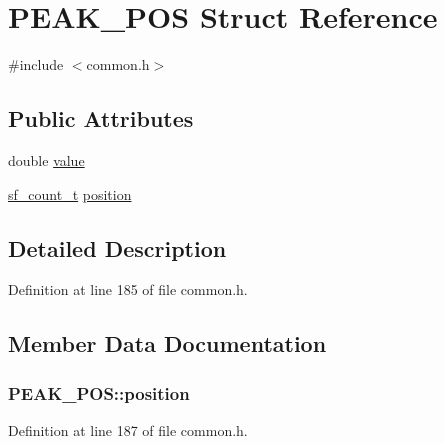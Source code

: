 \hypertarget{struct_p_e_a_k___p_o_s}{}\section{P\+E\+A\+K\+\_\+\+P\+OS Struct Reference}
\label{struct_p_e_a_k___p_o_s}


{\ttfamily \#include $<$common.\+h$>$}

\subsection*{Public Attributes}
\begin{DoxyCompactItemize}
\item 
double \hyperlink{struct_p_e_a_k___p_o_s_aa7d1d61bf8e210b4bf782c5aba0be3a1}{value}
\item 
\hyperlink{mac_2config_2i386_2lib-src_2libsndfile_2src_2sndfile_8h_a398121a5f562230ea7f772528fff5f84}{sf\+\_\+count\+\_\+t} \hyperlink{struct_p_e_a_k___p_o_s_a2c60a1b986a74e31831917521abac1e7}{position}
\end{DoxyCompactItemize}


\subsection{Detailed Description}


Definition at line 185 of file common.\+h.



\subsection{Member Data Documentation}
\subsubsection[{\texorpdfstring{position}{position}}]{ P\+E\+A\+K\+\_\+\+P\+O\+S\+::position}\hypertarget{struct_p_e_a_k___p_o_s_a2c60a1b986a74e31831917521abac1e7}{}\label{struct_p_e_a_k___p_o_s_a2c60a1b986a74e31831917521abac1e7}


Definition at line 187 of file common.\+h.

